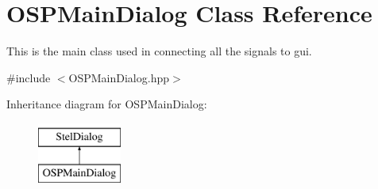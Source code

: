 \hypertarget{class_o_s_p_main_dialog}{\section{O\-S\-P\-Main\-Dialog Class Reference}
\label{class_o_s_p_main_dialog}
}


This is the main class used in connecting all the signals to gui.  




{\ttfamily \#include $<$O\-S\-P\-Main\-Dialog.\-hpp$>$}

Inheritance diagram for O\-S\-P\-Main\-Dialog\-:\begin{figure}[H]
\begin{center}
\leavevmode
\includegraphics[height=2.000000cm]{class_o_s_p_main_dialog}
\end{center}
\end{figure}
